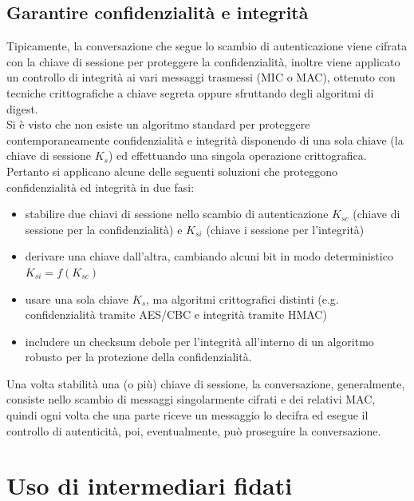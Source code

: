 \subsection{Garantire confidenzialità e integrità}
Tipicamente, la conversazione che segue lo scambio di autenticazione viene cifrata con la chiave di sessione per proteggere la confidenzialità, inoltre viene applicato un controllo di integrità ai vari messaggi trasmessi (MIC o MAC), ottenuto con tecniche crittografiche a chiave segreta oppure sfruttando degli algoritmi di digest.\\
Si è visto che non esiste un algoritmo standard per proteggere contemporaneamente confidenzialità e integrità disponendo di una sola chiave (la chiave di sessione $K_{s}$) ed effettuando una singola operazione crittografica. Pertanto si applicano alcune delle seguenti soluzioni che proteggono confidenzialità ed integrità in due fasi:
\begin{itemize}
	\item stabilire due chiavi di sessione nello scambio di autenticazione $K_{sc}$ (chiave di sessione per la confidenzialità) e $K_{si}$ (chiave i sessione per l'integrità)
	\item derivare una chiave dall'altra, cambiando alcuni bit in modo deterministico $K_{si} = f(K_{sc})$
	\item usare una sola chiave $K_{s}$, ma algoritmi crittografici distinti (e.g. confidenzialità tramite AES/CBC e integrità tramite HMAC)
	\item includere un checksum debole per l'integrità all'interno di un algoritmo robusto per la protezione della confidenzialità. 
\end{itemize}
Una volta stabilità una (o più) chiave di sessione, la conversazione, generalmente, consiste nello scambio di messaggi singolarmente cifrati e dei relativi MAC, quindi ogni volta che una parte riceve un messaggio lo decifra ed esegue il controllo di autenticità, poi, eventualmente, può proseguire la conversazione.

\section{Uso di intermediari fidati}
